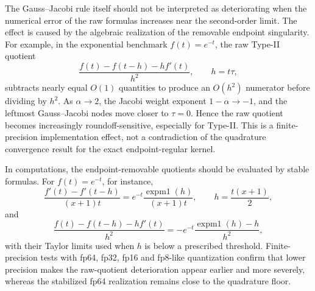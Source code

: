 \begin{remark}
The Gauss--Jacobi rule itself should not be interpreted as deteriorating when the numerical error of the raw formulas increases near the second-order limit.  The effect is caused by the algebraic realization of the removable endpoint singularity.  For example, in the exponential benchmark \(f(t)=e^{-t}\), the raw Type-II quotient
\[
  \frac{f(t)-f(t-h)-h f'(t)}{h^2},\qquad h=t\tau,
\]
subtracts nearly equal \(O(1)\) quantities to produce an \(O(h^2)\) numerator before dividing by \(h^2\).  As \(\alpha\to2\), the Jacobi weight exponent \(1-\alpha\to-1\), and the leftmost Gauss--Jacobi nodes move closer to \(\tau=0\).  Hence the raw quotient becomes increasingly roundoff-sensitive, especially for Type-II.  This is a finite-precision implementation effect, not a contradiction of the quadrature convergence result for the exact endpoint-regular kernel.

In computations, the endpoint-removable quotients should be evaluated by stable formulas.  For \(f(t)=e^{-t}\), for instance,
\[
  \frac{f'(t)-f'(t-h)}{(x+1)t}
  = e^{-t}\frac{\operatorname{expm1}(h)}{(x+1)t},
  \qquad h=\frac{t(x+1)}2,
\]
and
\[
  \frac{f(t)-f(t-h)-h f'(t)}{h^2}
  = -e^{-t}\frac{\operatorname{expm1}(h)-h}{h^2},
\]
with their Taylor limits used when \(h\) is below a prescribed threshold.  Finite-precision tests with fp64, fp32, fp16 and fp8-like quantization confirm that lower precision makes the raw-quotient deterioration appear earlier and more severely, whereas the stabilized fp64 realization remains close to the quadrature floor.
\end{remark}
